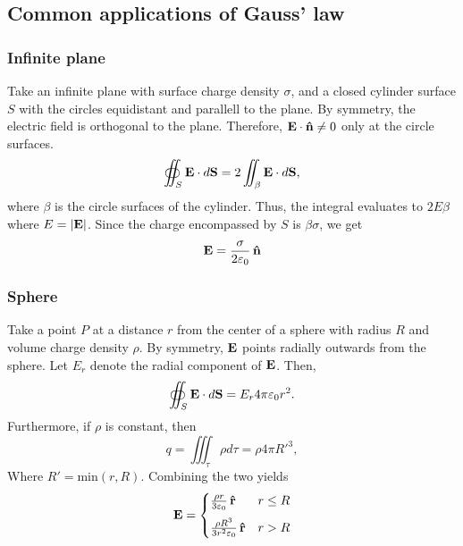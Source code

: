\subsection{Common applications of Gauss' law}
    \subsubsection{Infinite plane}
        Take an infinite plane with surface charge density $\sigma$, 
        and a closed cylinder surface $S$ with the circles equidistant and parallell to the plane. 
        By symmetry, the electric field is orthogonal to the plane. Therefore, $\E\cdot\hat{n} \neq 0$ only at the circle surfaces. 
        \begin{equation*}
            \oiint_S \mathbf{E}\cdot d\mathbf{S} = 2\iint_\beta \mathbf{E}\cdot d\mathbf{S},
        \end{equation*}
        where $\beta$ is the circle surfaces of the cylinder. Thus, the integral evaluates to $2E\beta$ where $E = |\mathbf{E}|$. 
        Since the charge encompassed by $S$ is $\beta\sigma$, we get
        \begin{equation}
            \E = \frac{\sigma}{2\e}\,\hat{n}
        \end{equation}

    \subsubsection{Sphere}
        Take a point $P$ at a distance $r$ from the center of a sphere with radius $R$ and volume charge density $\rho$. 
        By symmetry, $\mathbf{E}$ points radially outwards from the sphere. Let $E_r$ denote the radial component of $\mathbf{E}$. Then, 
        \begin{equation*}
            \oiint_S \mathbf{E}\cdot d\mathbf{S} = E_r4\pi\varepsilon_0 r^2.
        \end{equation*}
        Furthermore, if $\rho$ is constant, then
        \begin{equation*}
            q = \iiint_\tau \rho d\tau = \rho4\pi R'^3,
        \end{equation*}
        Where $R' = \text{min}(r, R)$. Combining the two yields
        \begin{equation}
            \E = 
            \begin{cases}
                \frac{\rho r}{3\e}\,\hat{r} & r \leq R \\
                \rule[-1.5ex]{0pt}{0pt}\rule{0pt}{4ex}
                \frac{\rho R^3}{3r^2\e}\,\hat{r} & r > R
            \end{cases}
        \end{equation}

